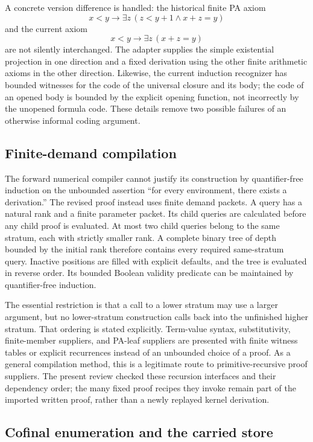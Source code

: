 \documentclass[11pt]{article}
\begin{document}
A concrete version difference is handled: the historical finite PA axiom
\[
 x<y\to\exists z\,(z<y+1\mathbin{\wedge}x+z=y)
\]
and the current axiom
\[
 x<y\to\exists z\,(x+z=y)
\]
are not silently interchanged.  The adapter supplies the simple
existential projection in one direction and a fixed derivation using
the other finite arithmetic axioms in the other direction.  Likewise,
the current induction recognizer has bounded witnesses for the code of
the universal closure and its body; the code of an opened body is
bounded by the explicit opening function, not incorrectly by the
unopened formula code.  These details remove two possible failures of
an otherwise informal coding argument.\cite{adapter}

\subsection{Finite-demand compilation}

The forward numerical compiler cannot justify its construction by
quantifier-free induction on the unbounded assertion ``for every
environment, there exists a derivation.''  The revised proof instead
uses finite demand packets.  A query has a natural rank and a finite
parameter packet.  Its child queries are calculated before any child
proof is evaluated.  At most two child queries belong to the same
stratum, each with strictly smaller rank.  A complete binary tree of
depth bounded by the initial rank therefore contains every required
same-stratum query.  Inactive positions are filled with explicit
defaults, and the tree is evaluated in reverse order.  Its bounded
Boolean validity predicate can be maintained by quantifier-free
induction.\cite{forward,termleaf}

The essential restriction is that a call to a lower stratum may use a
larger argument, but no lower-stratum construction calls back into the
unfinished higher stratum.  That ordering is stated explicitly.
Term-value syntax, substitutivity, finite-member suppliers, and PA-leaf
suppliers are presented with finite witness tables or explicit
recurrences instead of an unbounded choice of a proof.  As a general
compilation method, this is a legitimate route to primitive-recursive
proof suppliers.  The present review checked these recursion interfaces
and their dependency order; the many fixed proof recipes they invoke
remain part of the imported written proof, rather than a newly replayed
kernel derivation.\cite{forward,termleaf}

\subsection{Cofinal enumeration and the carried store}
\end{document}

